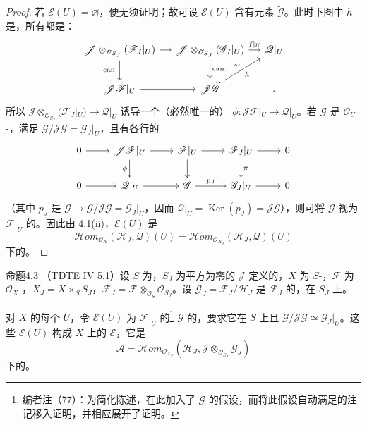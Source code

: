 \begin{proof}
若 $\mathscr E(U)=\varnothing$，便无须证明；故可设 $\mathscr E(U)$ 含有元素 $\widetilde{\mathscr G}$。此时下图中 $h$ 是，所有都是：
\[
\begin{tikzcd}[column sep=small]
\mathscr J\otimes_{\mathscr O_{S_J}}(\mathscr F_J|_U)\arrow[r]\arrow[d,"\mathrm{can.}"']&\mathscr J\otimes_{\mathscr O_{S_J}}(\mathscr G_J|_U)\arrow[r,"f|_U"]\arrow[d,"\mathrm{can.}"]&\mathscr Q|_U\\
\mathscr J\mathscr F|_U\arrow[r]&\mathscr J\widetilde{\mathscr G}\arrow[ur,"h"',"\sim"]&.
\end{tikzcd}
\]
所以 $\mathscr J\otimes_{\mathscr O_{S_J}}(\mathscr F_J|_U)\to\mathscr Q|_U$ 诱导一个（必然唯一的） $\phi:\mathscr J\mathscr F|_U\to\mathscr Q|_U$。若 $\mathscr G$ 是 $\mathscr O_U$-，满足 $\mathscr G/\mathscr J\mathscr G=\mathscr G_J|_U$，且有各行的
\[
\begin{tikzcd}
0\arrow[r]&\mathscr J\mathscr F|_U\arrow[r]\arrow[d,"\phi"']&\mathscr F|_U\arrow[r]\arrow[d]&\mathscr F_J|_U\arrow[r]\arrow[d,"\pi"]&0\\
0\arrow[r]&\mathscr Q|_U\arrow[r]&\mathscr G\arrow[r,"p_J"]&\mathscr G_J|_U\arrow[r]&0
\end{tikzcd}
\]
（其中 $p_J$ 是 $\mathscr G\to\mathscr G/\mathscr J\mathscr G=\mathscr G_J|_U$，因而 $\mathscr Q|_U=\operatorname{Ker}(p_J)=\mathscr J\mathscr G$），则可将 $\mathscr G$ 视为 $\mathscr F|_U$ 的。因此由 4.1(ii)，$\mathscr E(U)$ 是
\[\mathscr Hom_{\mathscr O_X}(\mathscr H_J,\mathscr Q)(U)=\mathscr Hom_{\mathscr O_{X_J}}(\mathscr H_J,\mathscr Q)(U)\]
下的。
\end{proof}
\begin{SGAresult}{命题}{4.3}
（TDTE IV 5.1）设 $S$ 为，$S_J$ 为平方为零的 $\mathscr J$ 定义的，$X$ 为 $S$-，$\mathscr F$ 为 $\mathscr O_X$-，$X_J=X\times_S S_J$，$\mathscr F_J=\mathscr F\otimes_{\mathscr O_S}\mathscr O_{S_J}$。设 $\mathscr G_J=\mathscr F_J/\mathscr H_J$ 是 $\mathscr F_J$ 的，在 $S_J$ 上。

对 $X$ 的每个 $U$，令 $\mathscr E(U)$ 为 $\mathscr F|_U$ 的\footnote{编者注（77）：为简化陈述，在此加入了 $\mathscr G$ 的假设，而将此假设自动满足的注记移入证明，并相应展开了证明。} $\mathscr G$ 的，要求它在 $S$ 上且 $\mathscr G/\mathscr J\mathscr G\simeq\mathscr G_J|_U$。这些 $\mathscr E(U)$ 构成 $X$ 上的 $\mathscr E$，它是
\[\mathscr A=\mathscr Hom_{\mathscr O_{X_J}}(\mathscr H_J,\mathscr J\otimes_{\mathscr O_{S_J}}\mathscr G_J)\]
下的。
\end{SGAresult}
